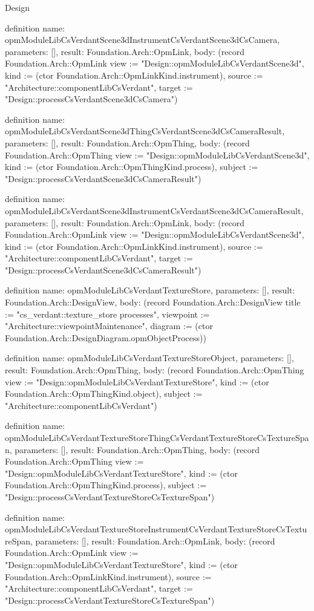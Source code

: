 \begin{lexlean}{Design}
\begin{semanticmodule}
definition{
  name: opmModuleLibCsVerdantScene3dInstrumentCsVerdantScene3dCsCamera,
  parameters: [],
  result: Foundation.Arch::OpmLink,
  body: (record Foundation.Arch::OpmLink {view := "Design::opmModuleLibCsVerdantScene3d", kind := (ctor Foundation.Arch::OpmLinkKind.instrument), source := "Architecture::componentLibCsVerdant", target := "Design::processCsVerdantScene3dCsCamera"})
}

definition{
  name: opmModuleLibCsVerdantScene3dThingCsVerdantScene3dCsCameraResult,
  parameters: [],
  result: Foundation.Arch::OpmThing,
  body: (record Foundation.Arch::OpmThing {view := "Design::opmModuleLibCsVerdantScene3d", kind := (ctor Foundation.Arch::OpmThingKind.process), subject := "Design::processCsVerdantScene3dCsCameraResult"})
}

definition{
  name: opmModuleLibCsVerdantScene3dInstrumentCsVerdantScene3dCsCameraResult,
  parameters: [],
  result: Foundation.Arch::OpmLink,
  body: (record Foundation.Arch::OpmLink {view := "Design::opmModuleLibCsVerdantScene3d", kind := (ctor Foundation.Arch::OpmLinkKind.instrument), source := "Architecture::componentLibCsVerdant", target := "Design::processCsVerdantScene3dCsCameraResult"})
}

definition{
  name: opmModuleLibCsVerdantTextureStore,
  parameters: [],
  result: Foundation.Arch::DesignView,
  body: (record Foundation.Arch::DesignView {title := "cs_verdant::texture_store processes", viewpoint := "Architecture::viewpointMaintenance", diagram := (ctor Foundation.Arch::DesignDiagram.opmObjectProcess)})
}

definition{
  name: opmModuleLibCsVerdantTextureStoreObject,
  parameters: [],
  result: Foundation.Arch::OpmThing,
  body: (record Foundation.Arch::OpmThing {view := "Design::opmModuleLibCsVerdantTextureStore", kind := (ctor Foundation.Arch::OpmThingKind.object), subject := "Architecture::componentLibCsVerdant"})
}

definition{
  name: opmModuleLibCsVerdantTextureStoreThingCsVerdantTextureStoreCsTextureSpan,
  parameters: [],
  result: Foundation.Arch::OpmThing,
  body: (record Foundation.Arch::OpmThing {view := "Design::opmModuleLibCsVerdantTextureStore", kind := (ctor Foundation.Arch::OpmThingKind.process), subject := "Design::processCsVerdantTextureStoreCsTextureSpan"})
}

definition{
  name: opmModuleLibCsVerdantTextureStoreInstrumentCsVerdantTextureStoreCsTextureSpan,
  parameters: [],
  result: Foundation.Arch::OpmLink,
  body: (record Foundation.Arch::OpmLink {view := "Design::opmModuleLibCsVerdantTextureStore", kind := (ctor Foundation.Arch::OpmLinkKind.instrument), source := "Architecture::componentLibCsVerdant", target := "Design::processCsVerdantTextureStoreCsTextureSpan"})
}


\end{semanticmodule}
\end{lexlean}
